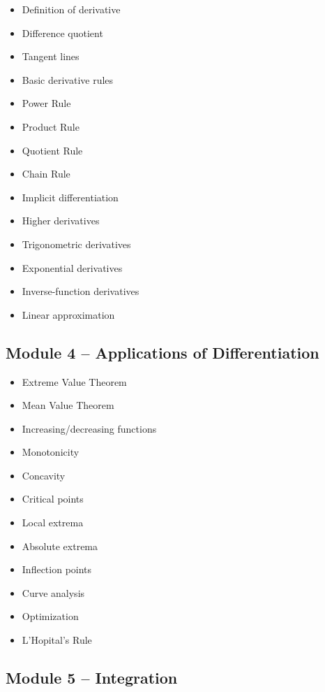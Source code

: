 \documentclass[11pt]{article}
\begin{document}
\begin{itemize}[label=$\square$]
    \item Definition of derivative
    \item Difference quotient
    \item Tangent lines
    \item Basic derivative rules
    \item Power Rule
    \item Product Rule
    \item Quotient Rule
    \item Chain Rule
    \item Implicit differentiation
    \item Higher derivatives
    \item Trigonometric derivatives
    \item Exponential derivatives
    \item Inverse-function derivatives
    \item Linear approximation
\end{itemize}

\subsection*{Module 4 -- Applications of Differentiation}

\begin{itemize}[label=$\square$]
    \item Extreme Value Theorem
    \item Mean Value Theorem
    \item Increasing/decreasing functions
    \item Monotonicity
    \item Concavity
    \item Critical points
    \item Local extrema
    \item Absolute extrema
    \item Inflection points
    \item Curve analysis
    \item Optimization
    \item L'Hopital's Rule
\end{itemize}

\subsection*{Module 5 -- Integration}
\end{document}
